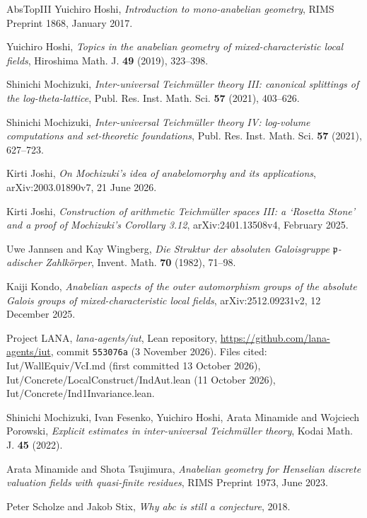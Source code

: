 \documentclass[11pt,a4paper]{article}
\newcommand{\leanus}{\textunderscore\allowbreak}
\newcommand{\lean}[1]{{\ttfamily\let\_\leanus #1}}
\theoremstyle{plain}
\theoremstyle{definition}
\theoremstyle{remark}
\begin{document}
\begin{thebibliography}{AbsTopIII}
Yuichiro Hoshi, \emph{Introduction to mono-anabelian geometry}, RIMS Preprint 1868, January 2017.

Yuichiro Hoshi, \emph{Topics in the anabelian geometry of mixed-characteristic local fields}, Hiroshima Math. J.
\textbf{49} (2019), 323--398.

Shinichi Mochizuki, \emph{Inter-universal Teichm\"uller theory III: canonical splittings of the log-theta-lattice},
Publ. Res. Inst. Math. Sci. \textbf{57} (2021), 403--626.

Shinichi Mochizuki, \emph{Inter-universal Teichm\"uller theory IV: log-volume computations and set-theoretic
foundations}, Publ. Res. Inst. Math. Sci. \textbf{57} (2021), 627--723.

Kirti Joshi, \emph{On Mochizuki's idea of anabelomorphy and its applications}, arXiv:2003.01890v7, 21 June 2026.

Kirti Joshi, \emph{Construction of arithmetic Teichm\"uller spaces III: a `Rosetta Stone' and a proof of Mochizuki's
Corollary 3.12}, arXiv:2401.13508v4, February 2025.

Uwe Jannsen and Kay Wingberg, \emph{Die Struktur der absoluten Galoisgruppe $\mathfrak p$-adischer Zahlk\"orper},
Invent. Math. \textbf{70} (1982), 71--98.

Kaiji Kondo, \emph{Anabelian aspects of the outer automorphism groups of the absolute Galois groups of
mixed-characteristic local fields}, arXiv:2512.09231v2, 12 December 2025.

Project LANA, \emph{lana-agents/iut}, Lean repository, \url{https://github.com/lana-agents/iut}, commit
\texttt{553076a} (3 November 2026). Files cited: \lean{Iut/WallEquiv/VcI.md} (first committed 13 October 2026),
\lean{Iut/Concrete/LocalConstruct/IndAut.lean} (11 October 2026), \lean{Iut/Concrete/Ind1Invariance.lean}.

Shinichi Mochizuki, Ivan Fesenko, Yuichiro Hoshi, Arata Minamide and Wojciech Porowski, \emph{Explicit estimates in
inter-universal Teichm\"uller theory}, Kodai Math. J. \textbf{45} (2022).

Arata Minamide and Shota Tsujimura, \emph{Anabelian geometry for Henselian discrete valuation fields with quasi-finite
residues}, RIMS Preprint 1973, June 2023.

Peter Scholze and Jakob Stix, \emph{Why abc is still a conjecture}, 2018.


\end{thebibliography}
\end{document}
